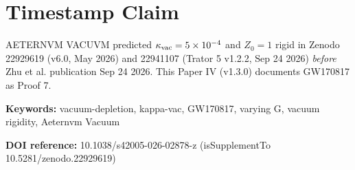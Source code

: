 \documentclass[11pt,a4paper]{article}
\begin{document}
\section{Timestamp Claim}
AETERNVM VACUVM predicted $\kappa_{\rm vac}=5\times10^{-4}$ and $Z_0=1$ rigid in Zenodo 22929619 (v6.0, May 2026) and 22941107 (Trator 5 v1.2.2, Sep 24 2026) \textit{before} Zhu et al. publication Sep 24 2026. This Paper IV (v1.3.0) documents GW170817 as Proof 7.

\vspace{0.5cm}
\noindent\textbf{Keywords:} vacuum-depletion, kappa-vac, GW170817, varying G, vacuum rigidity, Aeternvm Vacuum

\noindent\textbf{DOI reference:} 10.1038/s42005-026-02878-z (isSupplementTo 10.5281/zenodo.22929619)
\end{document}

